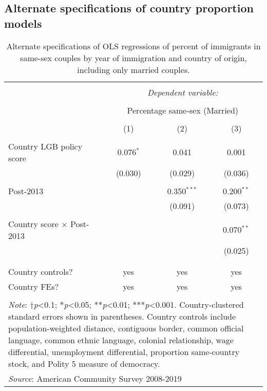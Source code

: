 \documentclass[
  11pt,
]{article}
\begin{document}
\newpage

\hypertarget{alternate-specifications-of-country-proportion-models}{%
\subsection{Alternate specifications of country proportion models}\label{alternate-specifications-of-country-proportion-models}}

\begin{table}[H] \centering 
  \caption{Alternate specifications of OLS regressions of percent of immigrants in same-sex couples by year of immigration and country of origin, including only married couples.} 
  \label{tab:country-props-alt} 
\begin{tabular}{@{\extracolsep{5pt}}lccc} 
\\[-1.8ex]\hline 
\hline \\[-1.8ex] 
 & \multicolumn{3}{c}{\textit{Dependent variable:}} \\ 
\cline{2-4} 
\\[-1.8ex] & \multicolumn{3}{c}{Percentage same-sex (Married)} \\ 
\\[-1.8ex] & (1) & (2) & (3)\\ 
\hline \\[-1.8ex] 
 Country LGB policy score & 0.076$^{*}$ & 0.041 & 0.001 \\ 
  & (0.030) & (0.029) & (0.036) \\ 
  & & & \\ 
 Post-2013 &  & 0.350$^{***}$ & 0.200$^{**}$ \\ 
  &  & (0.091) & (0.073) \\ 
  & & & \\ 
 Country score × Post-2013 &  &  & 0.070$^{**}$ \\ 
  &  &  & (0.025) \\ 
  & & & \\ 
\hline \\[-1.8ex] 
Country controls? & yes & yes & yes \\ 
Country FEs? & yes & yes & yes \\ 
\hline 
\hline \\[-1.8ex] 
\multicolumn{4}{l}{\parbox[t]{.7\textwidth}{\textit{Note}: †\textit{p}<0.1; *\textit{p}<0.05; **\textit{p}<0.01; ***\textit{p}<0.001. Country-clustered standard errors shown in parentheses. Country controls include population-weighted distance, contiguous border, common official language, common ethnic language, colonial relationship, wage differential, unemployment differential, proportion same-country stock, and Polity 5 measure of democracy.}} \\ 
\multicolumn{4}{l}{\textit{Source}: American Community Survey 2008-2019} \\ 
\end{tabular} 
\end{table}
\end{document}
